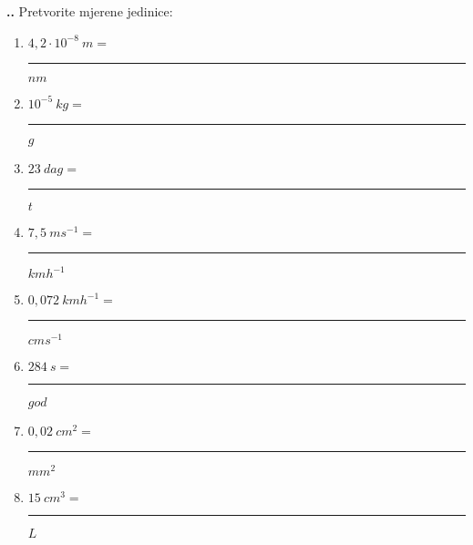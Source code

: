 
\noindent 
\textbf{
\thecjelina.\thezadatak.}
Pretvorite mjerene jedinice:
\begin{enumerate}[label=\alph*)]
  \item $4,2\cdot 10^{-8}\ m=$ \rule{3cm}{0.5pt} $ nm $
  \item $10^{-5}\ kg =$ \rule{3cm}{0.5pt}$ g$
  \item $23\ dag =$\rule{3cm}{0.5pt} $ t$  
  \item $7,5\ ms^{-1} = $ \rule{3cm}{0.5pt} $ kmh^{-1}$
  \item $0,072\ kmh^{-1} =$ \rule{3cm}{0.5pt} $cms^{-1}$
  \item $284\ s =$ \rule{3cm}{0.5pt} $god $
  \item $0,02\ cm^2=$ \rule{3cm}{0.5pt} $mm^2 $
  \item $15\ cm^3 =$ \rule{3cm}{0.5pt} $ L$
\end{enumerate}
